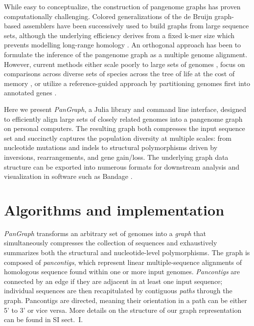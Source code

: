 \documentclass[aps,rmp,preprint,superscriptaddress,10pt,linenumbers]{revtex4-1}
\newcommand{\SIgraph}{I}
\begin{document}
While easy to conceptualize, the construction of pangenome graphs has proven computationally challenging.
Colored generalizations of the de Bruijn graph-based assemblers have been successively used to build graphs from large sequence sets, although the underlying efficiency derives from a fixed k-mer size which prevents modelling long-range homology \cite{iqbal2012novo,muggli2017succinct}.
An orthogonal approach has been to formulate the inference of the pangenome graph as a multiple genome alignment.
However, current methods either scale poorly to large sets of genomes \cite{darling2010progressivemauve}, focus on comparisons across diverse sets of species across the tree of life at the cost of memory \cite{armstrong2020progressive}, or utilize a reference-guided approach by partitioning genomes first into annotated genes \cite{gautreau2020ppanggolin,colquhoun2021pandora}.

Here we present \emph{PanGraph}, a Julia \cite{bezanson2017julia} library and command line interface, designed to efficiently align large sets of closely related genomes into a pangenome graph on personal computers.
The resulting graph both compresses the input sequence set and succinctly captures the population diversity at multiple scales: from nucleotide mutations and indels to structural polymorphisms driven by inversions, rearrangements, and gene gain/loss.
The underlying graph data structure can be exported into numerous formats for downstream analysis and visualization in software such as Bandage \cite{wick2015bandage}.

\section{Algorithms and implementation}
\emph{PanGraph} transforms an arbitrary set of genomes into a \emph{graph} that simultaneously compresses the collection of sequences and exhaustively summarizes both the structural and nucleotide-level polymorphisms.
The graph is composed of \emph{pancontigs}, which represent linear multiple-sequence alignments of homologous sequence found within one or more input genomes.
\emph{Pancontigs} are connected by an edge if they are adjacent in at least one input sequence; individual sequences are then recapitulated by contiguous \emph{paths} through the graph.
Pancontigs are directed, meaning their orientation in a path can be either 5' to 3' or vice versa.
More details on the structure of our graph representation can be found in SI sect.~\SIgraph{}.
\end{document}
